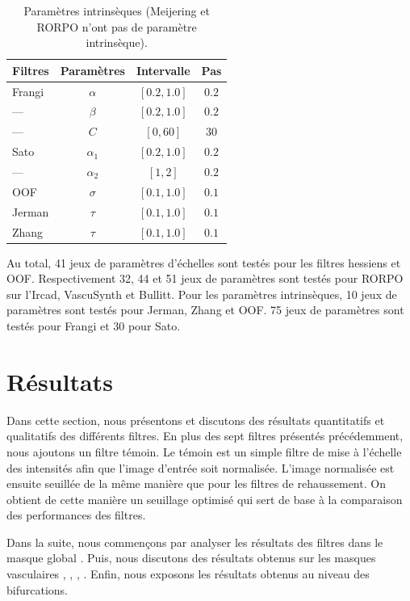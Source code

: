 \begin{table}[!ht]
  \caption{Paramètres intrinsèques (Meijering et RORPO n'ont pas de paramètre intrinsèque).}
  \label{table:PS_interval}
  \begin{center}
    \begin{tabular}{  l  c  c  c }
      \hline
      Filtres & Paramètres & Intervalle & Pas \\
      \hline
      Frangi & $\alpha$ & $[0.2,1.0]$ & $0.2$ \\
      ---       & $\beta$ & $[0.2,1.0]$ & $0.2$  \\
      ---       & $C$& $[0,60]$ & $30$ \\
      Sato & $\alpha_{1}$ & $[0.2,1.0]$ & $0.2$ \\
      ---     & $\alpha_{2}$ & $[1,2]$ & $0.2$ \\
      OOF & $\sigma$ & $[0.1,1.0]$ & $0.1$ \\
      Jerman & $\tau$ & $[0.1,1.0]$ & $0.1$ \\
      Zhang & $\tau$& $[0.1,1.0]$ & $0.1$ \\
      \hline
    \end{tabular}
  \end{center}
\end{table}
  
Au total, 41 jeux de paramètres d'échelles sont testés pour les filtres hessiens et OOF. Respectivement 32, 44 et 51 jeux de paramètres sont testés pour RORPO sur l'Ircad, VascuSynth et Bullitt. Pour les paramètres intrinsèques, 10 jeux de paramètres sont testés pour Jerman, Zhang et OOF. 75 jeux de paramètres sont testés pour Frangi et 30 pour Sato.
\section{Résultats}
Dans cette section, nous présentons et discutons des résultats quantitatifs et qualitatifs des différents filtres. En plus des sept filtres présentés précédemment, nous ajoutons un filtre témoin. Le témoin est un simple filtre de mise à l'échelle des intensités afin que l'image d'entrée soit normalisée. L'image normalisée est ensuite seuillée de la même manière que pour les filtres de rehaussement. On obtient de cette manière un seuillage optimisé qui sert de base à la comparaison des performances des filtres.

Dans la suite, nous commençons par analyser les résultats des filtres dans le masque global \maskglobal. Puis, nous discutons des résultats obtenus sur les masques vasculaires \maskvascular, \maskvesselLarge, \maskvesselMedium, \maskvesselSmall. Enfin, nous exposons les résultats obtenus au niveau des bifurcations.
